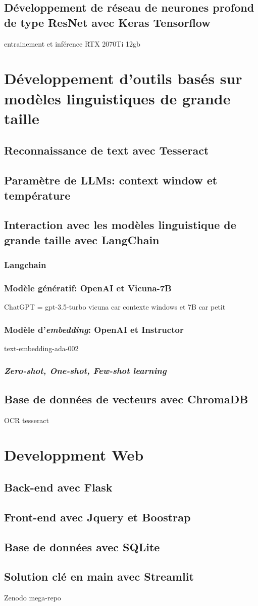 \subsection{Développement de réseau de neurones profond de type ResNet avec Keras Tensorflow}
entrainement et inférence RTX 2070Ti 12gb
\section{Développement d'outils basés sur modèles linguistiques de grande taille}
\subsection{Reconnaissance de text avec Tesseract}
\subsection{Paramètre de LLMs: context window et température}
\subsection{Interaction avec les modèles linguistique de grande taille avec LangChain}
\subsubsection{Langchain}
\subsubsection{Modèle génératif: OpenAI et Vicuna-7B}
ChatGPT = gpt-3.5-turbo
vicuna car contexte windows et 7B car petit
\subsubsection{Modèle d'\textit{embedding}: OpenAI et Instructor}
text-embedding-ada-002
\subsubsection{\textit{Zero-shot, One-shot, Few-shot learning}}
\subsection{Base de données de vecteurs avec ChromaDB}
OCR tesseract
\section{Developpment Web}
\subsection{Back-end avec Flask}
\subsection{Front-end avec Jquery et Boostrap}
\subsection{Base de données avec SQLite}
\subsection{Solution clé en main avec Streamlit}

Zenodo mega-repo